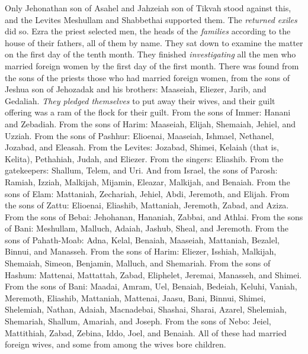 \begin{biblechapter}
\verse Only Jehonathan son of Asahel and Jahzeiah son of Tikvah stood against this, and the Levites Meshullam and Shabbethai supported them.
\verse The \textit{returned exiles} did so. Ezra the priest selected men, the heads of the \textit{families} according to the house of their fathers, all of them by name. They sat down to examine the matter on the first day of the tenth month.
\verse They finished \textit{investigating} all the men who married foreign women by the first day of the first month.
\verse There was found from the sons of the priests those who had married foreign women, from the sons of Jeshua son of Jehozadak and his brothers: Maaseiah, Eliezer, Jarib, and Gedaliah.
\verse \textit{They pledged themselves} to put away their wives, and their guilt offering was a ram of the flock for their guilt.
\verse From the sons of Immer: Hanani and Zebadiah.
\verse From the sons of Harim: Maaseiah, Elijah, Shemaiah, Jehiel, and Uzziah.
\verse From the sons of Pashhur: Elioenai, Maaseiah, Ishmael, Nethanel, Jozabad, and Eleasah.
\verse From the Levites: Jozabad, Shimei, Kelaiah (that is, Kelita), Pethahiah, Judah, and Eliezer.
\verse From the singers: Eliashib. From the gatekeepers: Shallum, Telem, and Uri.
\verse And from Israel, the sons of Parosh: Ramiah, Izziah, Malkijah, Mijamin, Eleazar, Malkijah, and Benaiah.
\verse From the sons of Elam: Mattaniah, Zechariah, Jehiel, Abdi, Jeremoth, and Elijah.
\verse From the sons of Zattu: Elioenai, Eliashib, Mattaniah, Jeremoth, Zabad, and Aziza.
\verse From the sons of Bebai: Jehohanan, Hananiah, Zabbai, and Athlai.
\verse From the sons of Bani: Meshullam, Malluch, Adaiah, Jashub, Sheal, and Jeremoth.
\verse From the sons of Pahath-Moab: Adna, Kelal, Benaiah, Maaseiah, Mattaniah, Bezalel, Binnui, and Manasseh.
\verse From the sons of Harim: Eliezer, Isshiah, Malkijah, Shemaiah, Simeon,
\verse Benjamin, Malluch, and Shemariah.
\verse From the sons of Hashum: Mattenai, Mattattah, Zabad, Eliphelet, Jeremai, Manasseh, and Shimei.
\verse From the sons of Bani: Maadai, Amram, Uel,
\verse Benaiah, Bedeiah, Keluhi,
\verse Vaniah, Meremoth, Eliashib,
\verse Mattaniah, Mattenai, Jaasu,
\verse Bani, Binnui, Shimei,
\verse Shelemiah, Nathan, Adaiah,
\verse Macnadebai, Shashai, Sharai,
\verse Azarel, Shelemiah, Shemariah,
\verse Shallum, Amariah, and Joseph.
\verse From the sons of Nebo: Jeiel, Mattithiah, Zabad, Zebina, Iddo, Joel, and Benaiah.
\verse All of these had married foreign wives, and some from among the wives bore children.
\end{biblechapter}

